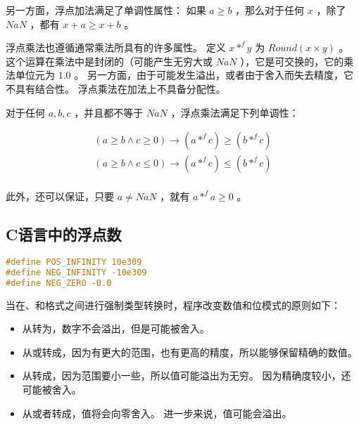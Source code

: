 {{        另一方面，浮点加法满足了单调性属性：
        如果 $a \geq b$ ，那么对于任何 $x$ ，除了 $NaN$ ，都有 $x + a \geq x + b$ 。

        浮点乘法也遵循通常乘法所具有的许多属性。
        定义 $x *^f y$ 为 $Round(x \times y)$ 。
        这个运算在乘法中是封闭的（可能产生无穷大或 $NaN$ ），它是可交换的，它的乘法单位元为 $1.0$ 。
        另一方面，由于可能发生溢出，或者由于舍入而失去精度，它不具有结合性。
        浮点乘法在加法上不具备分配性。

        对于任何 $a, b, c$ ，并且都不等于 $NaN$ ，浮点乘法满足下列单调性：

        \begin{align}
            (a \geq b \wedge c \geq 0) \rightarrow (a *^f c) \geq (b *^f c) \\
            (a \geq b \wedge c \leq 0) \rightarrow (a *^f c) \leq (b *^f c) \\
        \end{align}

        此外，还可以保证，只要 $a \neq NaN$ ，就有 $a *^f a \geq 0$ 。
    }

    \subsection{C语言中的浮点数}
    {
        \begin{practicec}
            \begin{codelist}
                \begin{lstlisting}[language=C]
#define POS_INFINITY 10e309
#define NEG_INFINITY -10e309
#define NEG_ZERO -0.0
                \end{lstlisting}
            \end{codelist}

        \end{practicec}

        当在、和格式之间进行强制类型转换时，程序改变数值和位模式的原则如下：

        \begin{itemize}
            \item 从转为，数字不会溢出，但是可能被舍入。
            \item 从或转成，因为有更大的范围，也有更高的精度，所以能够保留精确的数值。
            \item
            {
                从转成，因为范围要小一些，所以值可能溢出为无穷。
                因为精确度较小，还可能被舍入。
            }
            \item
            {
                从或者转成，值将会向零舍入。
                进一步来说，值可能会溢出。
            }
        \end{itemize}

}}
